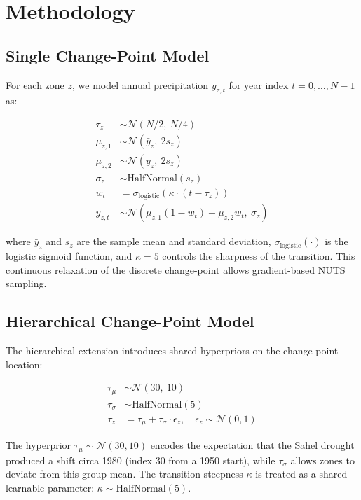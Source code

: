 \documentclass[conference]{IEEEtran}
\begin{document}
\section{Methodology}

\subsection{Single Change-Point Model}

For each zone $z$, we model annual precipitation $y_{z,t}$ for year index $t = 0, \ldots, N-1$ as:

\begin{align}
    \tau_z &\sim \mathcal{N}(N/2,\ N/4) \label{eq:tau_prior} \\
    \mu_{z,1} &\sim \mathcal{N}(\bar{y}_z,\ 2s_z) \\
    \mu_{z,2} &\sim \mathcal{N}(\bar{y}_z,\ 2s_z) \\
    \sigma_z &\sim \text{HalfNormal}(s_z) \\
    w_t &= \sigma_{\text{logistic}}(\kappa \cdot (t - \tau_z)) \label{eq:sigmoid} \\
    y_{z,t} &\sim \mathcal{N}(\mu_{z,1}(1 - w_t) + \mu_{z,2} w_t,\ \sigma_z) \label{eq:likelihood}
\end{align}

\noindent where $\bar{y}_z$ and $s_z$ are the sample mean and standard deviation, $\sigma_{\text{logistic}}(\cdot)$ is the logistic sigmoid function, and $\kappa = 5$ controls the sharpness of the transition. This continuous relaxation of the discrete change-point allows gradient-based NUTS sampling.

\subsection{Hierarchical Change-Point Model}

The hierarchical extension introduces shared hyperpriors on the change-point location:

\begin{align}
    \tau_\mu &\sim \mathcal{N}(30,\ 10) \label{eq:hyper_mu} \\
    \tau_\sigma &\sim \text{HalfNormal}(5) \\
    \tau_z &= \tau_\mu + \tau_\sigma \cdot \epsilon_z, \quad \epsilon_z \sim \mathcal{N}(0, 1)
\end{align}

\noindent The hyperprior $\tau_\mu \sim \mathcal{N}(30, 10)$ encodes the expectation that the Sahel drought produced a shift circa 1980 (index 30 from a 1950 start), while $\tau_\sigma$ allows zones to deviate from this group mean. The transition steepness $\kappa$ is treated as a shared learnable parameter: $\kappa \sim \text{HalfNormal}(5)$.
\end{document}
